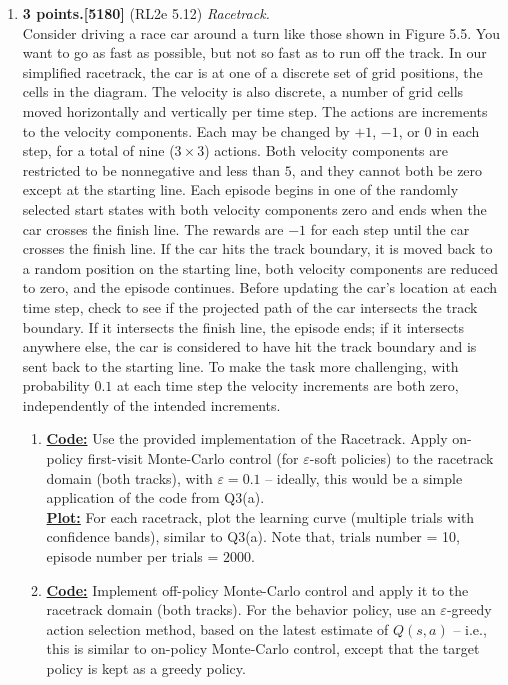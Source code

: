 \documentclass{article}
\begin{document}
\begin{enumerate}
	\item \textbf{3 points.[5180]} (RL2e 5.12) \textit{Racetrack.} \\
	      Consider driving a race car around a turn like those shown in Figure 5.5. You want to go as fast as possible, but not so fast as to run off the track. In our simplified racetrack, the car is at one of a discrete set of grid positions, the cells in the diagram. The velocity is also discrete, a number of grid cells moved horizontally and vertically per time step. The actions are increments to the velocity components. Each may be changed by $+1$, $-1$, or $0$ in each step, for a total of nine ($3 \times 3$) actions. Both velocity components are restricted to be nonnegative and less than $5$, and they cannot both be zero except at the starting line. Each episode begins in one of the randomly selected start states with both velocity components zero and ends when the car crosses the finish line. The rewards are $-1$ for each step until the car crosses the finish line. If the car hits the track boundary, it is moved back to a random position on the starting line, both velocity components are reduced to zero, and the episode continues. Before updating the car's location at each time step, check to see if the projected path of the car intersects the track boundary. If it intersects the finish line, the episode ends; if it intersects anywhere else, the car is considered to have hit the track boundary and is sent back to the starting line. To make the task more challenging, with probability $0.1$ at each time step the velocity increments are both zero, independently of the intended increments.
	      \begin{enumerate}
		      \item \uline{\textbf{Code:}} Use the provided implementation of the Racetrack. Apply on-policy first-visit Monte-Carlo control (for $\varepsilon$-soft policies) to the racetrack domain (both tracks), with $\varepsilon = 0.1$ -- ideally, this would be a simple application of the code from Q3(a).\\
		            \uline{\textbf{Plot:}} For each racetrack, plot the learning curve (multiple trials with confidence bands), similar to Q3(a). Note that, trials number = 10, episode number per trials = $2000$. 
		      \item \uline{\textbf{Code:}} Implement off-policy Monte-Carlo control and apply it to the racetrack domain (both tracks). For the behavior policy, use an $\varepsilon$-greedy action selection method, based on the latest estimate of $Q(s, a)$ -- i.e., this is similar to on-policy Monte-Carlo control, except that the target policy is kept as a greedy policy. \\

\end{enumerate}
\end{enumerate}
\end{document}
